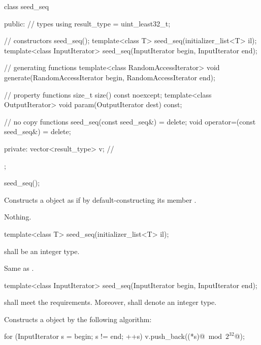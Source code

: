 %
\begin{codeblock}
class seed_seq {
public:
  // types
  using result_type = uint_least32_t;

  // constructors
  seed_seq();
  template<class T>
    seed_seq(initializer_list<T> il);
  template<class InputIterator>
    seed_seq(InputIterator begin, InputIterator end);

  // generating functions
  template<class RandomAccessIterator>
    void generate(RandomAccessIterator begin, RandomAccessIterator end);

  // property functions
  size_t size() const noexcept;
  template<class OutputIterator>
    void param(OutputIterator dest) const;

  // no copy functions
  seed_seq(const seed_seq&) = delete;
  void operator=(const seed_seq&) = delete;

private:
  vector<result_type> v;   // \expos
};
\end{codeblock}%


%
\begin{itemdecl}
seed_seq();
\end{itemdecl}

\begin{itemdescr}
\pnum\effects Constructs a  object
 as if by default-constructing its member .

\pnum
\throws Nothing.
\end{itemdescr}


%
\begin{itemdecl}
template<class T>
 seed_seq(initializer_list<T> il);
\end{itemdecl}

\begin{itemdescr}
\pnum\requires {} shall be an integer type.

\pnum\effects
 Same as .
\end{itemdescr}


%
\begin{itemdecl}
template<class InputIterator>
  seed_seq(InputIterator begin, InputIterator end);
\end{itemdecl}

\begin{itemdescr}
\pnum\requires
   shall meet the
   requirements.
  Moreover,
  shall denote an integer type.

\pnum\effects Constructs a  object
 by the following algorithm:
\begin{codeblock}
for (InputIterator s = begin; s != end; ++s)
 v.push_back((*s)@$\bmod 2^{32}$@);
\end{codeblock}%
\end{itemdescr}

